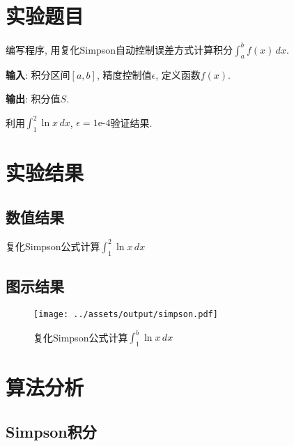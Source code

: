 \documentclass{nedsart}
\begin{document}
\maketitle

\tableofcontents

\section{实验题目}

编写程序, 用复化Simpson自动控制误差方式计算积分$\int_{a}^{b} f(x) \,dx$.

\textbf{输入}: 积分区间$[a,b]$, 精度控制值$\epsilon$, 定义函数$f(x)$.

\textbf{输出}: 积分值$S$.

利用$\int_{1}^{2} \ln{x} \,dx$, $\epsilon=\text{1e-4}$验证结果.

\section{实验结果}

\subsection{数值结果}

\begin{table}[H]
    \centering
    \label{tab:simpson}
    \caption{复化Simpson公式计算$\int_1^2 \ln{x} \,dx$}
\end{table}

\subsection{图示结果}

\begin{figure}[H]
    \centering
    \texttt{[image: ../assets/output/simpson.pdf]}
    \caption{复化Simpson公式计算$\int_1^b \ln{x} \,dx$}
    \label{fig:simpson}
\end{figure}

\section{算法分析}

\subsection{Simpson积分}
\end{document}
